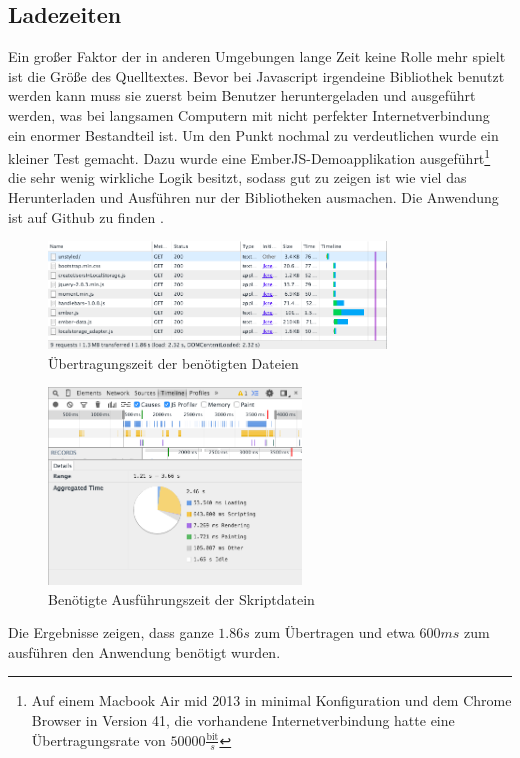 \documentclass[12pt,twoside]{book}
\begin{document}
\subsection{Ladezeiten}\label{sec:loadingtimes}

Ein großer Faktor der in anderen Umgebungen lange Zeit keine Rolle mehr spielt ist die Größe des Quelltextes. Bevor bei Javascript irgendeine Bibliothek benutzt werden kann muss sie zuerst beim Benutzer heruntergeladen und ausgeführt werden, was bei langsamen Computern mit nicht perfekter Internetverbindung ein enormer Bestandteil ist. Um den Punkt nochmal zu verdeutlichen wurde ein kleiner Test gemacht. Dazu wurde eine EmberJS-Demoapplikation ausgeführt\footnote{Auf einem Macbook Air mid 2013 in minimal Konfiguration und dem Chrome Browser in Version 41, die vorhandene Internetverbindung hatte eine Übertragungsrate von $50000 \frac{\text{bit}}{s}$} die sehr wenig wirkliche Logik besitzt, sodass gut zu zeigen ist wie viel das Herunterladen und Ausführen nur der Bibliotheken ausmachen.
Die Anwendung ist auf Github zu finden \cite{embercrud}.
\begin{figure}[h]
    \centering
    \includegraphics[width=0.8\textwidth]{images/performance_1.png}
    \caption{Übertragungszeit der benötigten Dateien}
    \label{fig:loadtimes}
\end{figure}
\begin{figure}[h]
    \centering
    \includegraphics[width=0.6\textwidth]{images/performance_2.png}
    \caption{Benötigte Ausführungszeit der Skriptdatein}
    \label{fig:executiontime}
\end{figure}
Die Ergebnisse zeigen, dass ganze $1.86s$ zum Übertragen und etwa $600ms$ zum ausführen den Anwendung benötigt wurden.
\end{document}
